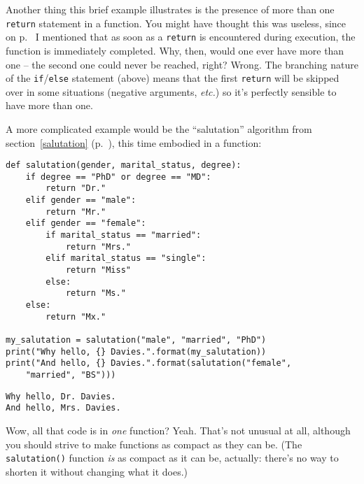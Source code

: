 Another thing this brief example illustrates is the presence of more than one
\texttt{return} statement in a function. You might have thought this was
useless, since on p.~\pageref{returnImmediatelyReturns} I mentioned that as
soon as a \texttt{return} is encountered during execution, the function is
immediately completed. Why, then, would one ever have more than one -- the
second one could never be reached, right? Wrong. The branching nature of the
\texttt{if}/\texttt{else} statement (above) means that the first
\texttt{return} will be skipped over in some situations (negative arguments,
\textit{etc.}) so it's perfectly sensible to have more than one.

A more complicated example would be the ``salutation'' algorithm from
section~\ref{salutation} (p.~\pageref{salutation}), this time embodied in a
function:

\begin{Verbatim}[fontsize=\small,samepage=true,frame=single,framesep=3mm]
def salutation(gender, marital_status, degree):
    if degree == "PhD" or degree == "MD":
        return "Dr."
    elif gender == "male":
        return "Mr."
    elif gender == "female":
        if marital_status == "married":
            return "Mrs."
        elif marital_status == "single":
            return "Miss"
        else:
            return "Ms."
    else:
        return "Mx."

my_salutation = salutation("male", "married", "PhD")
print("Why hello, {} Davies.".format(my_salutation))
print("And hello, {} Davies.".format(salutation("female",
    "married", "BS")))
\end{Verbatim}
\vspace{-.2in}

\begin{Verbatim}[fontsize=\small,samepage=true,frame=leftline,framesep=5mm,framerule=1mm]
Why hello, Dr. Davies.
And hello, Mrs. Davies.
\end{Verbatim}

Wow, all that code is in \textit{one} function? Yeah. That's not unusual at
all, although you should strive to make functions as compact as they can be.
(The \texttt{salutation()} function \textit{is} as compact as it can be,
actually: there's no way to shorten it without changing what it does.)


